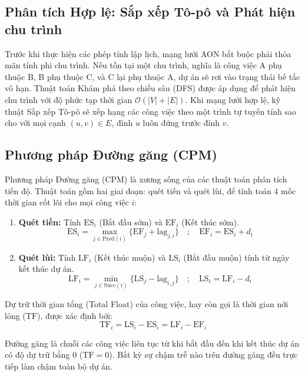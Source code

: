 \subsection{Phân tích Hợp lệ: Sắp xếp Tô-pô và Phát hiện chu trình}
Trước khi thực hiện các phép tính lập lịch, mạng lưới AON bắt buộc phải thỏa mãn tính phi chu trình. Nếu tồn tại một chu trình, nghĩa là công việc A phụ thuộc B, B phụ thuộc C, và C lại phụ thuộc A, dự án sẽ rơi vào trạng thái bế tắc vô hạn. Thuật toán Khám phá theo chiều sâu (DFS) được áp dụng để phát hiện chu trình với độ phức tạp thời gian $\mathcal{O}(|V| + |E|)$.
Khi mạng lưới hợp lệ, kỹ thuật Sắp xếp Tô-pô sẽ xếp hạng các công việc theo một trình tự tuyến tính sao cho với mọi cạnh $(u, v) \in E$, đỉnh $u$ luôn đứng trước đỉnh $v$.

\subsection{Phương pháp Đường găng (CPM)}
Phương pháp Đường găng (CPM) \cite{trietsch1993pert} là xương sống của các thuật toán phân tích tiến độ. Thuật toán gồm hai giai đoạn: quét tiến và quét lùi, để tính toán 4 mốc thời gian cốt lõi cho mọi công việc $i$:
\begin{enumerate}
    \item \textbf{Quét tiến:} Tính $\mathrm{ES}_i$ (Bắt đầu sớm) và $\mathrm{EF}_i$ (Kết thúc sớm).
    \begin{equation}
        \mathrm{ES}_i = \max_{j \in \mathrm{Pred}(i)} \{\mathrm{EF}_j + \text{lag}_{j,i}\} \quad ; \quad \mathrm{EF}_i = \mathrm{ES}_i + d_i
    \end{equation}
    \item \textbf{Quét lùi:} Tính $\mathrm{LF}_i$ (Kết thúc muộn) và $\mathrm{LS}_i$ (Bắt đầu muộn) tính từ ngày kết thúc dự án.
    \begin{equation}
        \mathrm{LF}_i = \min_{j \in \mathrm{Succ}(i)} \{\mathrm{LS}_j - \text{lag}_{i,j}\} \quad ; \quad \mathrm{LS}_i = \mathrm{LF}_i - d_i
    \end{equation}
\end{enumerate}

Dự trữ thời gian tổng (Total Float) của công việc, hay còn gọi là thời gian nới lỏng ($\mathrm{TF}$), được xác định bởi:
\begin{equation}
    \mathrm{TF}_i = \mathrm{LS}_i - \mathrm{ES}_i = \mathrm{LF}_i - \mathrm{EF}_i
\end{equation}

Đường găng là chuỗi các công việc liên tục từ khi bắt đầu đến khi kết thúc dự án có độ dự trữ bằng 0 ($\mathrm{TF} = 0$). Bất kỳ sự chậm trễ nào trên đường găng đều trực tiếp làm chậm toàn bộ dự án.

